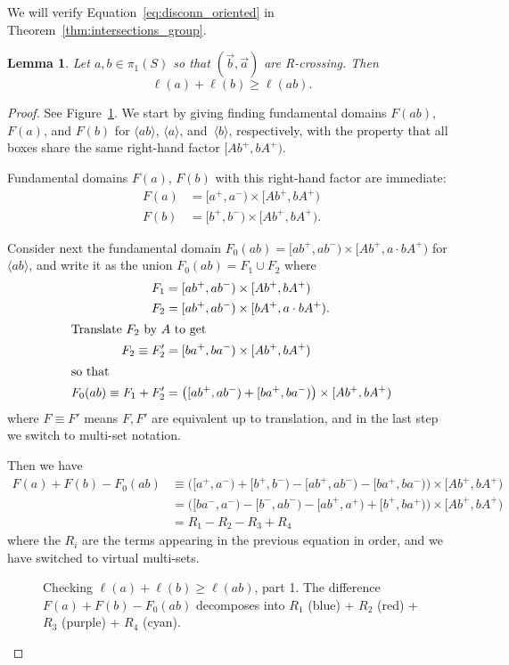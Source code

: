 \documentclass[11pt]{amsart}
\newcommand{\ora}[1]{\overrightarrow{#1}}
\newcommand*{\svgfignormal}[1]{\fontsize{9pt}{9pt}\selectfont}
\numberwithin{equation}{section}
\numberwithin{figure}{section}
\newtheorem{lemma}[theorem]{Lemma}
\theoremstyle{definition}
\theoremstyle{plain}
\begin{document}
We will verify Equation~\eqref{eq:disconn_oriented} in Theorem~\ref{thm:intersections_group}.

\begin{lemma}\label{lem:crossratio_disconnected_smoothing}
Let $a, b \in \pi_1(S)$ so that $(\ora{b},\ora{a})$ are R-crossing.
Then
\[
\ell(a) + \ell(b) \geq \ell(ab).
\]
\end{lemma}

\begin{proof}
See
Figure~\ref{fig:rcross_cr}. We start by giving finding
fundamental domains $F(ab)$, $F(a)$, and $F(b)$ for $\langle ab \rangle$,
$\langle a \rangle$, and~$\langle b \rangle$, respectively, with the property that all
boxes share the same right-hand factor $[Ab^+, bA^+)$.

Fundamental domains $F(a)$, $F(b)$ with this right-hand factor are immediate:
\begin{align*}
  F(a) &= [a^+, a^-) \times [Ab^+, bA^+)\\
  F(b) &= [b^+, b^-) \times [Ab^+, bA^+).
\end{align*}

Consider next the fundamental domain $F_0(ab) = [ab^+,ab^-) \times [Ab^+, a
\cdot bA^+)$ for $\langle ab \rangle$, and write it as the union
$F_0(ab) = F_1 \cup F_2$ where
\begin{align*}
  F_1 &= [ab^+,ab^-) \times [Ab^+, bA^+) \\
  F_2 &= [ab^+,ab^-) \times [bA^+, a \cdot bA^+).
  \\\intertext{Translate $F_2$ by $A$ to get}
  F_2 \equiv F_2' &= [ba^+,ba^-) \times [Ab^+, bA^+)
  \\\intertext{so that}
  F_0(ab) \equiv F_1 + F_2' &= \bigl([ab^+,ab^-) + [ba^+,ba^-)\bigr)
                            \times [Ab^+, bA^+)
\end{align*}
where $F \equiv F'$ means $F, F'$ are equivalent up to translation, and in the last step we switch to multi-set notation.


Then we have
\begin{align*}
  F(a) + F(b) - F_0(ab)
    &\equiv \bigl([a^+,a^-) + [b^+, b^-) - [ab^+,ab^-) - [ba^+,ba^-)\bigr)
      \times [Ab^+, bA^+)\\
    &= \bigl([ba^-,a^-) - [b^-,ab^-) - [ab^+,a^+) + [b^+,ba^+)\bigr)
      \times [Ab^+, bA^+)\\
    &= R_1 - R_2 - R_3 + R_4
\end{align*}
where the $R_i$ are the terms appearing in the previous equation in
order, and we have switched to virtual multi-sets. 
\begin{figure}[ht]
     \centering
\resizebox{80mm}{!}{\svgfignormal{rcross_cr}}
    \caption{Checking $\ell(a) + \ell(b) \geq \ell(ab)$, part 1.
      The difference $F(a) + F(b) - F_0(ab)$  decomposes into $R_1$ (blue) + $R_2$
      (red) + 
      $R_3$ (purple) + $R_4$ (cyan).}\label{fig:rcross_cr}
\end{figure}


\end{proof}
\end{document}
